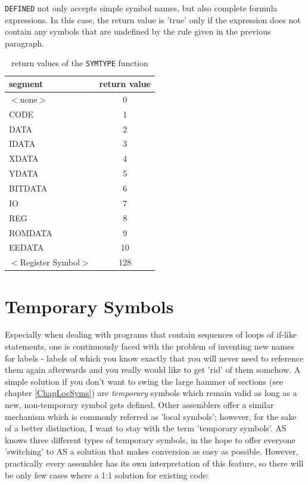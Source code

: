 \documentclass[12pt,twoside]{report}
\newcommand{\tty}[1]{{\tt #1}}
\newcommand{\asname}{{AS}}
\begin{document}
\tty{DEFINED} not only accepts simple symbol names, but also complete
formula expressions.  In this case, the return value is 'true' only if the
expression does not contain any symbols that are undefined by the rule
given in the previous paragraph.
\begin{table}[htb]
\begin{center}
\begin{tabular}{|l|c|}
\hline
segment & return value \\
\hline
$<$none$>$ & 0 \\
CODE & 1 \\
DATA & 2 \\
IDATA & 3 \\
XDATA & 4 \\
YDATA & 5 \\
BITDATA & 6 \\
IO & 7 \\
REG & 8 \\
ROMDATA & 9 \\
EEDATA & 10 \\
$<$Register Symbol$>$ & 128 \\
\hline
\end{tabular}
\end{center}
\caption{return values of the \tty{SYMTYPE} function\label{TabSegNums}}
\end{table}


\section{Temporary Symbols}

Especially when dealing with programs that contain sequences of loops of
if-like statements, one is continuously faced with the problem of
inventing new names for labels - labels of which you know exactly that you
will never need to reference them again afterwards and you really would
like to get 'rid' of them somehow.  A simple solution if you don't want to
swing the large hammer of sections (see chapter \ref{ChapLocSyms}) are
{\em temporary} symbols which remain valid as long as a new,
non-temporary symbol gets defined.  Other assemblers offer a similar
mechanism which is commonly referred as 'local symbols'; however, for the
sake of a better distinction, I want to stay with the term 'temporary
symbols'.  \asname{} knows three different types of temporary symbols, in the
hope to offer everyone 'switching' to \asname{} a solution that makes conversion
as easy as possible.  However, practically every assembler has its own
interpretation of this feature, so there will be only few cases where a
1:1 solution for existing code:
\end{document}
